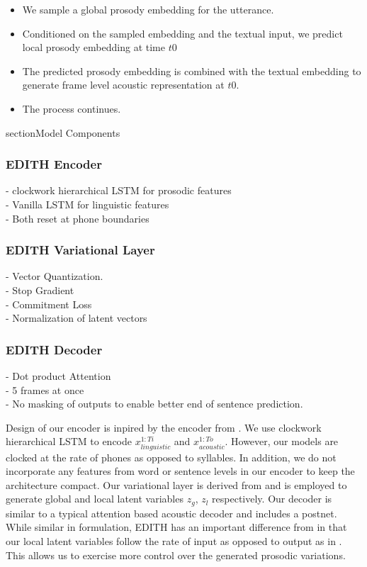 \begin{itemize}
    \item We sample a global prosody embedding for the utterance.
    \item Conditioned on the sampled embedding and the textual input, we predict local prosody embedding at time $t0$
    \item The predicted prosody embedding is combined with the textual embedding to generate frame level acoustic representation at $t0$.
    \item The process continues.
\end{itemize}

section{Model Components}

\subsubsection{EDITH Encoder}

- clockwork hierarchical LSTM for prosodic features \\
- Vanilla LSTM for linguistic features \\
- Both reset at phone boundaries \\


\subsubsection{EDITH Variational Layer}

- Vector Quantization. \\
- Stop Gradient \\
- Commitment Loss \\
- Normalization of latent vectors

\subsubsection{EDITH Decoder}

- Dot product Attention \\
- 5 frames at once \\
- No masking of outputs to enable better end of sentence prediction.
\fi

Design of our encoder is inpired by the encoder from \citep{chive}. We use clockwork hierarchical LSTM to encode \textbf{$x_{linguistic}^{1:Ti}$} and \textbf{$x_{acoustic}^{1:To}$}. However, our models are clocked at the rate of phones as opposed to syllables. In addition, we do not incorporate any features from word or sentence levels in our encoder to keep the architecture compact. Our variational layer is derived from \citep{vqvae} and is employed  to generate global and local latent variables $z_{g}$, $z_{l}$ respectively. Our decoder is similar to a typical attention based acoustic decoder\citep{tacotron_original} and includes a postnet. While similar in formulation, EDITH has an important difference from \citep{chive} in that our local latent variables follow the rate of input as opposed to output as in \citep{chive}. This allows us to exercise more control over the generated prosodic variations. 

